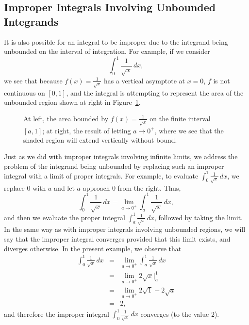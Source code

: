 

\subsection*{Improper Integrals Involving Unbounded Integrands}

It is also possible for an integral to be improper due to the integrand being unbounded on the interval of integration.  For example, if we consider 
$$\int_0^1 \frac{1}{\sqrt{x}} \, dx,$$
we see that because $f(x) = \frac{1}{\sqrt{x}}$ has a vertical asymptote at $x = 0$, $f$ is not continuous on $[0,1]$, and the integral is attempting to represent the area of the unbounded region shown at right in Figure~\ref{F:6.5.InfIntegrand}.

\begin{figure}[h]
\begin{center}
\caption{At left, the area bounded by $f(x) = \frac{1}{\sqrt{x}}$ on the finite interval $[a,1]$; at right, the result of letting $a \to 0^+$, where we see that the shaded region will extend vertically without bound.} \label{F:6.5.InfIntegrand}
\end{center}
\end{figure}

Just as we did with improper integrals involving infinite limits, we address the problem of the integrand being unbounded by replacing such an improper integral with a limit of proper integrals.  For example, to evaluate $\int_0^1 \frac{1}{\sqrt{x}} \, dx$, we replace $0$ with $a$ and let $a$ approach 0 from the right.  Thus,
$$\int_0^1 \frac{1}{\sqrt{x}} \, dx = \lim_{a \to 0^+} \int_a^1 \frac{1}{\sqrt{x}} \, dx,$$
and then we evaluate the proper integral $\int_a^1 \frac{1}{\sqrt{x}} \, dx$, followed by taking the limit.  In the same way as with improper integrals involving unbounded regions, we will say that the improper integral converges provided that this limit exists, and diverges otherwise.  In the present example, we observe that
\begin{eqnarray*}
\int_0^1 \frac{1}{\sqrt{x}} \, dx & = & \lim_{a \to 0^+} \int_a^1 \frac{1}{\sqrt{x}} \, dx \\
					& = & \lim_{a \to 0^+} 2\sqrt{x} \big\vert_a^1 \\
					& = & \lim_{a \to 0^+} 2\sqrt{1} - 2\sqrt{a} \\
					& = & 2,
\end{eqnarray*}
and therefore the improper integral $\int_0^1 \frac{1}{\sqrt{x}} \, dx$ converges (to the value 2).

